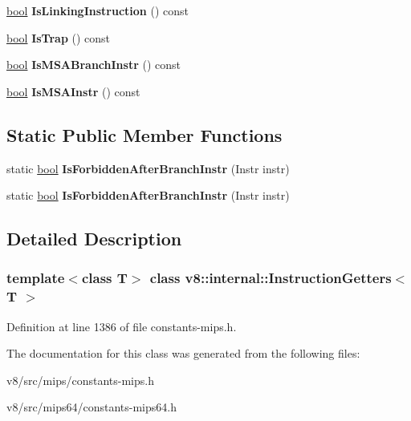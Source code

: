 \begin{DoxyCompactItemize}
\mbox{\label{classv8_1_1internal_1_1InstructionGetters_a371842a2800d48d4ae9eacfa1b230c82}} 
\mbox{\hyperlink{classbool}{bool}} {\bfseries Is\+Linking\+Instruction} () const
\item 
\mbox{\label{classv8_1_1internal_1_1InstructionGetters_aa4ec87b0f7874eed726044686c88f621}} 
\mbox{\hyperlink{classbool}{bool}} {\bfseries Is\+Trap} () const
\item 
\mbox{\label{classv8_1_1internal_1_1InstructionGetters_a92506f259ad86e77153ed16149e1efca}} 
\mbox{\hyperlink{classbool}{bool}} {\bfseries Is\+M\+S\+A\+Branch\+Instr} () const
\item 
\mbox{\label{classv8_1_1internal_1_1InstructionGetters_a129019c7364116c7b1c9985dfd8e1a4b}} 
\mbox{\hyperlink{classbool}{bool}} {\bfseries Is\+M\+S\+A\+Instr} () const
\end{DoxyCompactItemize}
\subsection*{Static Public Member Functions}
\begin{DoxyCompactItemize}
\item 
\mbox{\label{classv8_1_1internal_1_1InstructionGetters_abe1de234e947c6c4fc43b9dc028f752e}} 
static \mbox{\hyperlink{classbool}{bool}} {\bfseries Is\+Forbidden\+After\+Branch\+Instr} (Instr instr)
\item 
\mbox{\label{classv8_1_1internal_1_1InstructionGetters_ab87bcd086f8cf14d9b4192f547201fc1}} 
static \mbox{\hyperlink{classbool}{bool}} {\bfseries Is\+Forbidden\+After\+Branch\+Instr} (Instr instr)
\end{DoxyCompactItemize}


\subsection{Detailed Description}
\subsubsection*{template$<$class T$>$\newline
class v8\+::internal\+::\+Instruction\+Getters$<$ T $>$}



Definition at line 1386 of file constants-\/mips.\+h.



The documentation for this class was generated from the following files\+:\begin{DoxyCompactItemize}
\item 
v8/src/mips/constants-\/mips.\+h\item 
v8/src/mips64/constants-\/mips64.\+h\end{DoxyCompactItemize}
